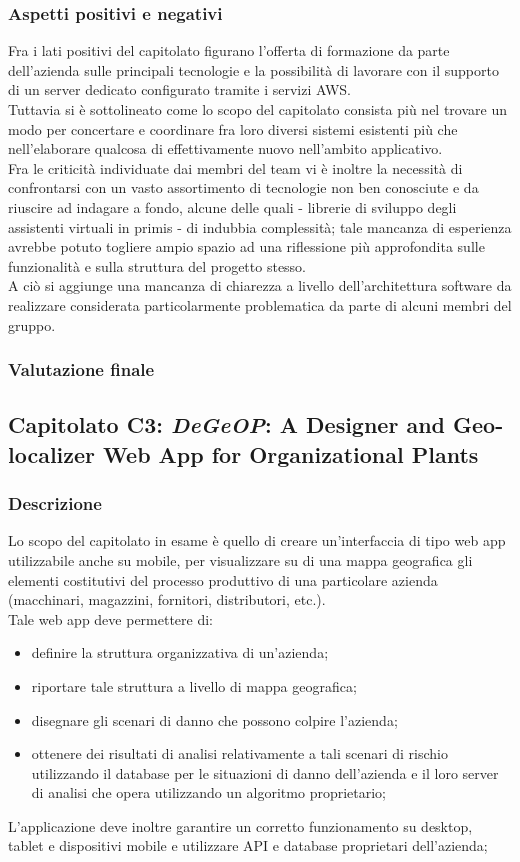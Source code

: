 		\subsubsection{Aspetti positivi e negativi}
		Fra i lati positivi del capitolato figurano l'offerta di formazione da parte dell'azienda sulle principali tecnologie e la possibilità di 
		lavorare con il supporto di un server dedicato configurato tramite i servizi AWS.\\
		Tuttavia si è sottolineato come lo scopo del capitolato consista più nel trovare un modo per concertare e coordinare fra loro diversi sistemi 
		esistenti più che nell'elaborare qualcosa di effettivamente nuovo nell'ambito applicativo.\\
		Fra le criticità individuate dai membri del team vi è inoltre la necessità di confrontarsi con un vasto assortimento di tecnologie non ben 
		conosciute e da riuscire ad indagare a fondo, alcune delle quali - librerie di sviluppo degli assistenti virtuali in primis - di indubbia 
		complessità; tale mancanza di esperienza avrebbe potuto togliere ampio spazio ad una riflessione più approfondita sulle funzionalità e sulla 
		struttura del progetto stesso.\\
		A ciò si aggiunge una mancanza di chiarezza a livello dell'architettura software da realizzare considerata particolarmente problematica da 
		parte di alcuni membri del gruppo.
		\subsubsection{Valutazione finale}
		
	\subsection{Capitolato C3: \emph{DeGeOP}: A Designer and Geo-localizer Web App for Organizational Plants}
		\subsubsection{Descrizione}
		Lo scopo del capitolato in esame è quello di creare un'interfaccia di tipo web app utilizzabile anche su mobile, per visualizzare su di una 
		mappa geografica gli elementi costitutivi del processo produttivo di una particolare azienda (macchinari, magazzini, fornitori, distributori, etc.).
		\\Tale web app deve permettere di:
		\begin{itemize}
			\item definire la struttura organizzativa di un'azienda;
			\item riportare tale struttura a livello di mappa geografica;
			\item disegnare gli scenari di danno che possono colpire l'azienda;
			\item ottenere dei risultati di analisi relativamente a tali scenari di rischio utilizzando il database per le situazioni di danno dell'azienda e il loro server di analisi che opera utilizzando un algoritmo proprietario;
		\end{itemize}
		L'applicazione deve inoltre garantire un corretto funzionamento su desktop, tablet e dispositivi mobile e utilizzare API e database proprietari dell'azienda;

